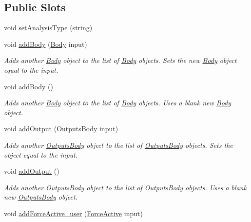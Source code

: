 \subsection*{Public Slots}
\begin{DoxyCompactItemize}
\item 
void \hyperlink{class_system_ae58c969c9ba0a1ec4bebff64b88a22ed}{set\-Analysis\-Type} (string)
\item 
void \hyperlink{class_system_a0e146c46e245b3222a77fbcf93901630}{add\-Body} (\hyperlink{class_body}{Body} input)
\begin{DoxyCompactList}\small\item\em Adds another \hyperlink{class_body}{Body} object to the list of \hyperlink{class_body}{Body} objects. Sets the new \hyperlink{class_body}{Body} object equal to the input. \end{DoxyCompactList}\item 
void \hyperlink{class_system_a31949bbe2fceb1df4ba99f9c9c9465cd}{add\-Body} ()
\begin{DoxyCompactList}\small\item\em Adds another \hyperlink{class_body}{Body} object to the list of \hyperlink{class_body}{Body} objects. Uses a blank new \hyperlink{class_body}{Body} object. \end{DoxyCompactList}\item 
void \hyperlink{class_system_a439bada214bf663084c15939a1793e02}{add\-Output} (\hyperlink{class_outputs_body}{Outputs\-Body} input)
\begin{DoxyCompactList}\small\item\em Adds another \hyperlink{class_outputs_body}{Outputs\-Body} object to the list of \hyperlink{class_outputs_body}{Outputs\-Body} objects. Sets the object equal to the input. \end{DoxyCompactList}\item 
void \hyperlink{class_system_a4f84d2819d8a095818cb08bc84fa92f9}{add\-Output} ()
\begin{DoxyCompactList}\small\item\em Adds another \hyperlink{class_outputs_body}{Outputs\-Body} object to the list of \hyperlink{class_outputs_body}{Outputs\-Body} objects. Uses a blank new \hyperlink{class_outputs_body}{Outputs\-Body} object. \end{DoxyCompactList}\item 
void \hyperlink{class_system_a66aaf1fda6d136711c53b0196fd2a50f}{add\-Force\-Active\-\_\-user} (\hyperlink{class_force_active}{Force\-Active} input)

\end{DoxyCompactItemize}
